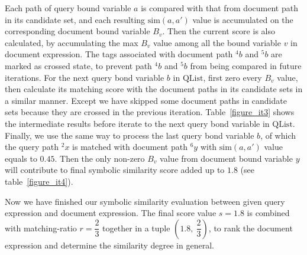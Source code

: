 Each path of query bound variable $a$ is compared with that from document path in its candidate set, 
and each resulting $\mathrm{sim}(a,a')$ value is accumulated on the corresponding document bound variable $B_v$.
Then the current score is also calculated, by accumulating the max $B_v$ value among all the bound variable $v$ in document expression.
The tags associated with document path $^4b$ and $^5b$ are marked as crossed state, to prevent path $^4b$ and $^5b$ from being compared in future iterations.
For the next query bond variable $b$ in $\mathrm{QList}$, 
first zero every $B_v$ value, 
then calculate its matching score with the document paths in its candidate sets in a similar manner.
Except we have skipped some document paths in candidate sets because they are crossed in the previous iteration.
Table~\ref{figure_it3} shows the intermediate results before iterate to the next query bond variable in $\mathrm{QList}$.
Finally, we use the same way to process the last query bond variable $b$, of which the query path $^2x$ is matched with document path $^6 y$ with $\mathrm{sim}(a,a')$ value equals to $0.45$. Then the only non-zero $B_v$ value from document bound variable $y$ will contribute to final symbolic similarity score added up to $1.8$ (see table~\ref{figure_it4}). 

Now we have finished our symbolic similarity evaluation between given query expression and document expression. The final score value $s=1.8$ is combined with matching-ratio $r = \dfrac{2}{3}$ together in a tuple $(1.8,\ \dfrac{2}{3})$, to rank the document expression and determine the similarity degree in general.
